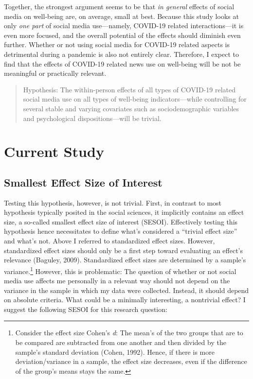 \documentclass[
  english,
  man,mask,floatsintext]{apa6}
\begin{document}
Together, the strongest argument seems to be that \emph{in general} effects of social media on well-being are, on average, small at best.
Because this study looks at only \emph{one part} of social media use---namely, COVID-19 related interactions---it is even more focused, and the overall potential of the effects should diminish even further.
Whether or not using social media for COVID-19 related aspects is detrimental during a pandemic is also not entirely clear.
Therefore, I expect to find that the effects of COVID-19 related news use on well-being will be not be meaningful or practically relevant.

\begin{quote}
Hypothesis: The within-person effects of all types of COVID-19 related social media use on all types of well-being indicators---while controlling for several stable and varying covariates such as sociodemographic variables and psychological dispositions---will be trivial.
\end{quote}

\hypertarget{current-study}{%
\section{Current Study}\label{current-study}}

\hypertarget{smallest-effect-size-of-interest}{%
\subsection{Smallest Effect Size of Interest}\label{smallest-effect-size-of-interest}}

Testing this hypothesis, however, is not trivial.
First, in contrast to most hypothesis typically posited in the social sciences, it implicitly contains an effect size, a so-called smallest effect size of interest (SESOI).
Effectively testing this hypothesis hence necessitates to define what's considered a ``trivial effect size'' and what's not.
Above I referred to standardized effect sizes.
However, standardized effect sizes should only be a first step toward evaluating an effect's relevance (Baguley, 2009).
Standardized effect sizes are determined by a sample's variance.\footnote{Consider the effect size Cohen's \emph{d}: The mean's of the two groups that are to be compared are subtracted from one another and then divided by the sample's standard deviation (Cohen, 1992). Hence, if there is more deviation/variance in a sample, the effect size decreases, even if the difference of the group's means stays the same.}
However, this is problematic: The question of whether or not social media use affects me personally in a relevant way should not depend on the variance in the sample in which my data were collected.
Instead, it should depend on absolute criteria.
What could be a minimally interesting, a nontrivial effect?
I suggest the following SESOI for this research question:
\end{document}
